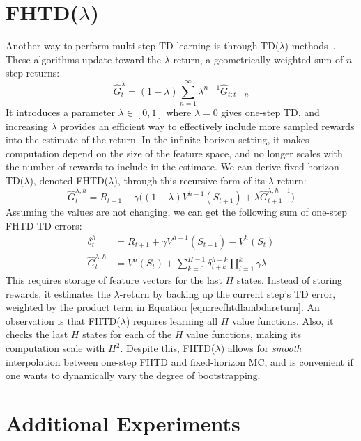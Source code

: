 \begin{appendices}
\section{FHTD($\lambda$)}

Another way to perform multi-step TD learning is through TD($\lambda$) methods~\cite{rlbook2018}. These algorithms update toward the $\lambda$-return, a geometrically-weighted sum of $n$-step returns:
\begin{equation}
\hat{G}_t^\lambda = (1 - \lambda)\sum_{n=1}^{\infty}{\lambda^{n - 1}\hat{G}_{t:t+n}}
\label{eqn:deflambdareturn}
\end{equation}
It introduces a parameter $\lambda \in [0, 1]$ where $\lambda = 0$ gives one-step TD, and increasing $\lambda$ provides an efficient way to effectively include more sampled rewards into the estimate of the return. In the infinite-horizon setting, it makes computation depend on the size of the feature space, and no longer scales with the number of rewards to include in the estimate.
We can derive fixed-horizon TD($\lambda$), denoted FHTD($\lambda$), through this recursive form of its $\lambda$-return:
\begin{equation}
    \hat{G}^{\lambda, h}_t = R_{t+1} + \gamma\bigg((1 - \lambda)V^{h - 1}(S_{t+1}) + \lambda \hat{G}^{\lambda, h - 1}_{t + 1}\bigg)
    \label{eqn:deffhtdlambdareturn}
\end{equation}
Assuming the values are not changing, we can get the following sum of one-step FHTD TD errors:
\begin{align}
\delta^h_t &= R_{t+1} + \gamma V^{h - 1}(S_{t+1}) - V^h(S_{t})
\label{eqn:onestepfhtdtderror} \\
\hat{G}^{\lambda, h}_t &= V^h(S_t) + \sum^{H - 1}_{k = 0}{\delta^{h - k}_{t + k}\prod^{k}_{i = 1}{\gamma \lambda}}
\label{eqn:recfhtdlambdareturn}
\end{align}
This requires storage of feature vectors for the last $H$ states. Instead of storing rewards, it estimates the $\lambda$-return by backing up the current step's TD error, weighted by the product term in Equation \ref{eqn:recfhtdlambdareturn}. An observation is that FHTD($\lambda$) requires learning all $H$ value functions. Also, it checks the last $H$ states for each of the $H$ value functions, making its computation scale with $H^2$. Despite this, FHTD($\lambda$) allows for \textit{smooth} interpolation between one-step FHTD and fixed-horizon MC, and is convenient if one wants to dynamically vary the degree of bootstrapping.

\section{Additional Experiments}


\end{appendices}
